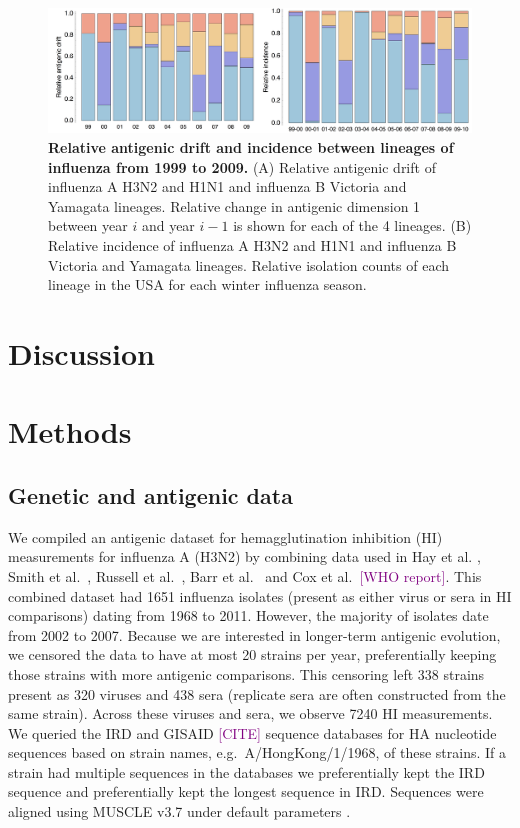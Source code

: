 \documentclass[11pt,oneside,letterpaper]{article}
\def\tbc#1{\textcolor{purple}{[#1]}}
\begin{document}
\begin{figure}[tb]
	\centering		
	\includegraphics[width=\textwidth]{figures/drift_incidence}
	\caption{\textbf{Relative antigenic drift and incidence between lineages of influenza from 1999 to 2009.} 
	(A) Relative antigenic drift of influenza A H3N2 and H1N1 and influenza B Victoria and Yamagata lineages.
	Relative change in antigenic dimension 1 between year $i$ and year $i-1$ is shown for each of the 4 lineages.
	(B) Relative incidence of influenza A H3N2 and H1N1 and influenza B Victoria and Yamagata lineages.
	Relative isolation counts of each lineage in the USA for each winter influenza season.
	} 
	\label{drift_incidence} 
\end{figure}

\section*{Discussion}

\section*{Methods}

\subsection*{Genetic and antigenic data}

We compiled an antigenic dataset for hemagglutination inhibition (HI) measurements for influenza A (H3N2) by combining data used in Hay et al. \cite{Hay01}, Smith et al.\ \cite{Smith04}, Russell et al.\ \cite{Russell08}, Barr et al.\ \cite{Barr10} and Cox et al.\ \tbc{WHO report}. 
This combined dataset had 1651 influenza isolates (present as either virus or sera in HI comparisons) dating from 1968 to 2011. 
However, the majority of isolates date from 2002 to 2007. 
Because we are interested in longer-term antigenic evolution, we censored the data to have at most 20 strains per year, preferentially keeping those strains with more antigenic comparisons. 
This censoring left 338 strains present as 320 viruses and 438 sera (replicate sera are often constructed from the same strain). 
Across these viruses and sera, we observe 7240 HI measurements. 
We queried the IRD \cite{IRD} and GISAID \tbc{CITE} sequence databases for HA nucleotide sequences based on strain names, e.g.\ A/HongKong/1/1968, of these strains. 
If a strain had multiple sequences in the databases we preferentially kept the IRD sequence and preferentially kept the longest sequence in IRD. 
Sequences were aligned using MUSCLE v3.7 under default parameters \cite{MUSCLE}.
\end{document}
